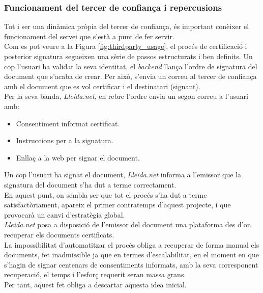 \subsubsection{Funcionament del tercer de confiança i repercusions}
Tot i ser una dinàmica pròpia del tercer de confiança, és important conèixer el funcionament del servei que s'està a punt de fer servir.\\
\newline Com es pot veure a la Figura \ref{fig:thirdparty_usage}, el procés de certificació i posterior signatura segueixen una sèrie de passos estructurats i ben definits.
Un cop l'usuari ha validat la seva identitat, el \textit{backend} llança l'ordre de signatura del document que s'acaba de crear. Per això, s'envia un correu al tercer de confiança amb el document que es vol certificar i el destinatari (signant).\\
\newline Per la seva banda, \textit{Lleida.net}, en rebre l'ordre envia un segon correu a l'usuari amb:
\begin{itemize}
    \item Consentiment informat certificat.
    \item Instruccions per a la signatura.
    \item Enllaç a la web per signar el document.
\end{itemize}
Un cop l'usuari ha signat el document, \textit{Lleida.net} informa a l'emissor que la signatura del document s'ha dut a terme correctament.\\
\newline En aquest punt, on sembla ser que tot el procés s'ha dut a terme satisfactòriament, apareix el primer contratemps d'aquest projecte, i que provocarà un canvi d'estratègia global.\\
\newline \textit{Lleida.net} posa a disposició de l'emissor del document una plataforma des d'on recuperar els documents certificats.\\
\newline La impossibilitat d'automatitzar el procés obliga a recuperar de forma manual els documents, fet inadmissible ja que en termes d'escalabilitat, en el moment en que s'hagin de signar centenars de consentiments informats, amb la seva corresponent recuperació, el temps i l'esforç requerit seran massa grans.\\
Per tant, aquest fet obliga a descartar aquesta idea inicial.%

